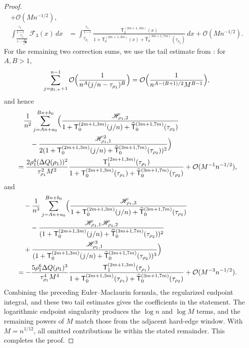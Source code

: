 \documentclass[a4paper]{article}
\numberwithin{equation}{section}
\begin{document}
\begin{proof}
\begin{align*}
+\mathcal{O}(Mn^{-1/2}), 
\\
\int_{\frac{\tau_{\rho_1}}{1-\frac{M}{\sqrt{n}}}}^{\frac{\tau_{\rho_1}}{1-\epsilon}}
\mathscr{F}_3(x)\,dx
&=
\int_{\tau_{\rho_1}}^{\frac{\tau_{\rho_1}}{1-\epsilon}}
\frac{\mathsf{T}_{2}^{(2m+1,3m)}(x)}{1+\mathsf{T}_{0}^{(2m+1,3m)}(x)+\widehat{\mathsf{T}}_{0}^{(3m+1,7m)}(\tau_{\rho_2})}\,dx
+
\mathcal{O}(Mn^{-1/2}). 
\end{align*}
For the remaining two correction sums, we use the tail estimate from
\cite[proof of Lemma~2.6]{ACCL1}: for $A,B>1$,
\[
\sum_{j=g_{1,+}+1}^{n-1}\mathcal{O}\Bigl(\frac{1}{n^A(j/n-\tau_{\rho_1})^B}\Bigr)
=
\mathcal{O}\Bigl(\frac{1}{n^{A-(B+1)/2}M^{B-1}}\Bigr),
\]
and hence
\begin{align*}
&\quad \frac{1}{n^2}\sum_{j=An+a_0}^{Bn+b_0}\Bigl( 
\frac{\mathscr{H}_{\rho_1,2}}{1+\mathsf{T}_{0}^{(2m+1,3m)}(j/n)+\widehat{\mathsf{T}}_{0}^{(3m+1,7m)}(\tau_{\rho_2})}\\
&\qquad-\frac{\mathscr{H}_{\rho_1,1}^2}{2(1+\mathsf{T}_{0}^{(2m+1,3m)}(j/n)+\widehat{\mathsf{T}}_{0}^{(3m+1,7m)}(\tau_{\rho_2}))^2}
\Bigr)
\\
&=
\frac{2\rho_1^4(\Delta Q(\rho_1))^2}{\tau_{\rho_1}^2M^2}
\frac{\mathsf{T}_{1}^{(2m+1,3m)}(\tau_{\rho_1})}{1+\mathsf{T}_{0}^{(2m+1,3m)}(\tau_{\rho_1})+\widehat{\mathsf{T}}_{0}^{(3m+1,7m)}(\tau_{\rho_2})}
+\mathcal{O}(M^{-1}n^{-1/2}),
\end{align*}
and 
\begin{align*}
 &\quad 
 -\frac{1}{n^3}
\sum_{j=An+a_0}^{Bn+b_0}
\Bigl( 
\frac{\mathscr{H}_{\rho_1,3}}{1+\mathsf{T}_{0}^{(2m+1,3m)}(j/n)+\widehat{\mathsf{T}}_{0}^{(3m+1,7m)}(\tau_{\rho_2})}
\\
&\qquad-\frac{\mathscr{H}_{\rho_1,1}\mathscr{H}_{\rho_1,2}}{(1+\mathsf{T}_{0}^{(2m+1,3m)}(j/n)+\widehat{\mathsf{T}}_{0}^{(3m+1,7m)}(\tau_{\rho_2}))^2}
\\
&\quad
+\frac{\mathscr{H}_{\rho_1,1}^3}{(1+\mathsf{T}_{0}^{(2m+1,3m)}(j/n)+\widehat{\mathsf{T}}_{0}^{(3m+1,7m)}(\tau_{\rho_2}))^3}
\Bigr)
\\
&=
-
\frac{5\rho_1^6\Delta Q(\rho_1)^3}{\tau_{\rho_1}^4M^4}
\frac{\mathsf{T}_{1}^{(2m+1,3m)}(\tau_{\rho_1})}{1+\mathsf{T}_{0}^{(2m+1,3m)}(\tau_{\rho_1})+\widehat{\mathsf{T}}_{0}^{(3m+1,7m)}(\tau_{\rho_2})}
+\mathcal{O}(M^{-3}n^{-1/2}). 
\end{align*}
Combining the preceding Euler--Maclaurin formula, the regularized endpoint
integral, and these two tail estimates gives the coefficients in the
statement.  The logarithmic endpoint singularity produces the $\log n$ and
$\log M$ terms, and the remaining powers of $M$ match those from the adjacent
hard-edge window.  With $M=n^{1/12}$, all omitted contributions lie within the
stated remainder.  This completes the proof.
\end{proof}
\end{document}
